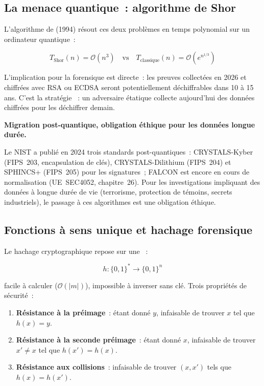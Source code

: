 \subsection{La menace quantique~: algorithme de Shor}

L'algorithme de  (1994) résout
ces deux problèmes en temps polynomial sur un ordinateur quantique~:

\begin{equation}
T_{\text{Shor}}(n) = \mathcal{O}(n^3)
\quad \text{vs} \quad
T_{\text{classique}}(n) = \mathcal{O}(e^{n^{1/3}})
\label{eq:shor}
\end{equation}

L'implication pour la forensique est directe~: les preuves collectées en 2026
et chiffrées avec RSA ou ECDSA seront potentiellement déchiffrables dans
10 à 15 ans. C'est la stratégie
~:
un adversaire étatique collecte aujourd'hui des données chiffrées pour les
déchiffrer demain.

\begin{boxalert}
\textbf{Migration post-quantique, obligation éthique pour les données
longue durée.}

Le NIST a publié en 2024 trois standards post-quantiques~:
CRYSTALS-Kyber (FIPS~203, encapsulation de clés), CRYSTALS-Dilithium
(FIPS~204) et SPHINCS+ (FIPS~205) pour les signatures~; FALCON est
encore en cours de normalisation (UE~SEC4052, chapitre~26). Pour les investigations impliquant des données à longue
durée de vie (terrorisme, protection de témoins, secrets industriels),
le passage à ces algorithmes est une obligation éthique.
\end{boxalert}

\subsection{Fonctions à sens unique et hachage forensique}

Le hachage cryptographique repose sur une
~:

\begin{equation}
h : \{0,1\}^* \to \{0,1\}^n
\label{eq:hash-def}
\end{equation}

facile à calculer ($\mathcal{O}(|m|)$), impossible à inverser sans clé.
Trois propriétés de sécurité~:
\begin{enumerate}
    \item \textbf{Résistance à la préimage}~: étant donné $y$, infaisable
          de trouver $x$ tel que $h(x) = y$.
    \item \textbf{Résistance à la seconde préimage}~: étant donné $x$,
          infaisable de trouver $x' \neq x$ tel que $h(x') = h(x)$.
    \item \textbf{Résistance aux collisions}~: infaisable de trouver
          $(x, x')$ tels que $h(x) = h(x')$.
\end{enumerate}

